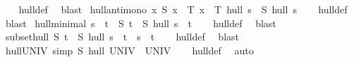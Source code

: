 \begin{isabellebody}
%
\isadelimproof
\ \ %
\endisadelimproof
%
\isatagproof
{}\isamarkupfalse%
\ hull{\isacharunderscore}{\kern0pt}def\ \isamarkupfalse%
\ blast%
\endisatagproof
{\isafoldproof}%
%
\isadelimproof
\isanewline
%
\endisadelimproof
\isanewline
{}\isamarkupfalse%
\ hull{\isacharunderscore}{\kern0pt}antimono{\isacharcolon}{\kern0pt}\ {\isachardoublequoteopen}{\isasymforall}x{\isachardot}{\kern0pt}\ S\ x\ {\isasymlongrightarrow}\ T\ x\ {\isasymLongrightarrow}\ {\isacharparenleft}{\kern0pt}T\ hull\ s{\isacharparenright}{\kern0pt}\ {\isasymsubseteq}\ {\isacharparenleft}{\kern0pt}S\ hull\ s{\isacharparenright}{\kern0pt}{\isachardoublequoteclose}\isanewline
%
\isadelimproof
\ \ %
\endisadelimproof
%
\isatagproof
{}\isamarkupfalse%
\ hull{\isacharunderscore}{\kern0pt}def\ \isamarkupfalse%
\ blast%
\endisatagproof
{\isafoldproof}%
%
\isadelimproof
\isanewline
%
\endisadelimproof
\isanewline
{}\isamarkupfalse%
\ hull{\isacharunderscore}{\kern0pt}minimal{\isacharcolon}{\kern0pt}\ {\isachardoublequoteopen}s\ {\isasymsubseteq}\ t\ {\isasymLongrightarrow}\ S\ t\ {\isasymLongrightarrow}\ {\isacharparenleft}{\kern0pt}S\ hull\ s{\isacharparenright}{\kern0pt}\ {\isasymsubseteq}\ t{\isachardoublequoteclose}\isanewline
%
\isadelimproof
\ \ %
\endisadelimproof
%
\isatagproof
{}\isamarkupfalse%
\ hull{\isacharunderscore}{\kern0pt}def\ \isamarkupfalse%
\ blast%
\endisatagproof
{\isafoldproof}%
%
\isadelimproof
\isanewline
%
\endisadelimproof
\isanewline
{}\isamarkupfalse%
\ subset{\isacharunderscore}{\kern0pt}hull{\isacharcolon}{\kern0pt}\ {\isachardoublequoteopen}S\ t\ {\isasymLongrightarrow}\ S\ hull\ s\ {\isasymsubseteq}\ t\ {\isasymlongleftrightarrow}\ s\ {\isasymsubseteq}\ t{\isachardoublequoteclose}\isanewline
%
\isadelimproof
\ \ %
\endisadelimproof
%
\isatagproof
{}\isamarkupfalse%
\ hull{\isacharunderscore}{\kern0pt}def\ \isamarkupfalse%
\ blast%
\endisatagproof
{\isafoldproof}%
%
\isadelimproof
\isanewline
%
\endisadelimproof
\isanewline
{}\isamarkupfalse%
\ hull{\isacharunderscore}{\kern0pt}UNIV\ {\isacharbrackleft}{\kern0pt}simp{\isacharbrackright}{\kern0pt}{\isacharcolon}{\kern0pt}\ {\isachardoublequoteopen}S\ hull\ UNIV\ {\isacharequal}{\kern0pt}\ UNIV{\isachardoublequoteclose}\isanewline
%
\isadelimproof
\ \ %
\endisadelimproof
%
\isatagproof
{}\isamarkupfalse%
\ hull{\isacharunderscore}{\kern0pt}def\ \isamarkupfalse%
\ auto%
\endisatagproof

\end{isabellebody}

